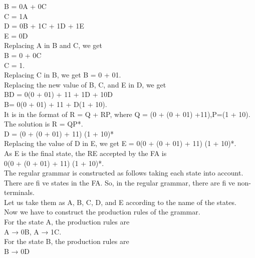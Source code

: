 \documentclass[10pt,a4paper]{book}
\begin{document}
\hspace*{5cm} B = 0A + 0C\\
\hspace*{5cm} C = 1A\\
\hspace*{5cm} D = 0B + 1C + 1D + 1E\\
\hspace*{5cm} E = 0D\\
Replacing A in B and C, we get\\
\hspace*{5cm}B = 0 + 0C\\
\hspace*{5cm}C = 1.\\
Replacing C in B, we get B = 0 + 01.\\
Replacing the new value of B, C, and E in D, we get\\
\hspace*{5cm}BD = 0(0 + 01) + 11 + 1D + 10D\\
\hspace*{5cm}B= 0(0 + 01) + 11 + D(1 + 10).\\
It is in the format of R = Q + RP, where Q = (0 + (0 + 01) +11),P=(1 + 10).\\
 The solution is R = QP*.\\
 \hspace*{5cm}D = (0 + (0 + 01) + 11) (1 + 10)*\\
 Replacing the value of D in E, we get E = 0(0 + (0 + 01) + 11) (1 + 10)*.\\
 As E is the final state, the RE accepted by the FA is\\
\hspace*{5cm}0(0 + (0 + 01) + 11) (1 + 10)*.\\
The regular grammar is constructed as follows taking each state into account.\\
 There are fi ve states in the FA. So, in the regular grammar, there are fi ve non-terminals.\\
 Let us take them as A, B, C, D, and E according to the name of the states.\\
 Now we have to construct the production rules of the grammar.\\
 For the state A, the production rules are\\
 \hspace*{5cm}A → 0B, A → 1C.\\
 For the state B, the production rules are\\
 \hspace*{5cm}B → 0D \newpage
 
\end{document}
